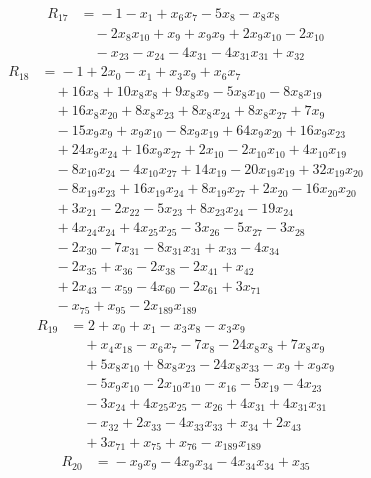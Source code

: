 \begin{align*}
R_{17}&={}-1 -x_{1} +x_{6}x_{7} -5x_{8} -x_{8}x_{8}\\
&\quad{}-2x_{8}x_{10} +x_{9} +x_{9}x_{9} +2x_{9}x_{10} -2x_{10}\\
&\quad{}-x_{23} -x_{24} -4x_{31} -4x_{31}x_{31} +x_{32}
\end{align*}
\begin{align*}
R_{18}&={}-1 +2x_{0} -x_{1} +x_{3}x_{9} +x_{6}x_{7}\\
&\quad{}+16x_{8} +10x_{8}x_{8} +9x_{8}x_{9} -5x_{8}x_{10} -8x_{8}x_{19}\\
&\quad{}+16x_{8}x_{20} +8x_{8}x_{23} +8x_{8}x_{24} +8x_{8}x_{27} +7x_{9}\\
&\quad{}-15x_{9}x_{9} +x_{9}x_{10} -8x_{9}x_{19} +64x_{9}x_{20} +16x_{9}x_{23}\\
&\quad{}+24x_{9}x_{24} +16x_{9}x_{27} +2x_{10} -2x_{10}x_{10} +4x_{10}x_{19}\\
&\quad{}-8x_{10}x_{24} -4x_{10}x_{27} +14x_{19} -20x_{19}x_{19} +32x_{19}x_{20}\\
&\quad{}-8x_{19}x_{23} +16x_{19}x_{24} +8x_{19}x_{27} +2x_{20} -16x_{20}x_{20}\\
&\quad{}+3x_{21} -2x_{22} -5x_{23} +8x_{23}x_{24} -19x_{24}\\
&\quad{}+4x_{24}x_{24} +4x_{25}x_{25} -3x_{26} -5x_{27} -3x_{28}\\
&\quad{}-2x_{30} -7x_{31} -8x_{31}x_{31} +x_{33} -4x_{34}\\
&\quad{}-2x_{35} +x_{36} -2x_{38} -2x_{41} +x_{42}\\
&\quad{}+2x_{43} -x_{59} -4x_{60} -2x_{61} +3x_{71}\\
&\quad{}-x_{75} +x_{95} -2x_{189}x_{189}
\end{align*}
\begin{align*}
R_{19}&={}2 +x_{0} +x_{1} -x_{3}x_{8} -x_{3}x_{9}\\
&\quad{}+x_{4}x_{18} -x_{6}x_{7} -7x_{8} -24x_{8}x_{8} +7x_{8}x_{9}\\
&\quad{}+5x_{8}x_{10} +8x_{8}x_{23} -24x_{8}x_{33} -x_{9} +x_{9}x_{9}\\
&\quad{}-5x_{9}x_{10} -2x_{10}x_{10} -x_{16} -5x_{19} -4x_{23}\\
&\quad{}-3x_{24} +4x_{25}x_{25} -x_{26} +4x_{31} +4x_{31}x_{31}\\
&\quad{}-x_{32} +2x_{33} -4x_{33}x_{33} +x_{34} +2x_{43}\\
&\quad{}+3x_{71} +x_{75} +x_{76} -x_{189}x_{189}
\end{align*}
\begin{align*}
R_{20}&={}-x_{9}x_{9} -4x_{9}x_{34} -4x_{34}x_{34} +x_{35}
\end{align*}
